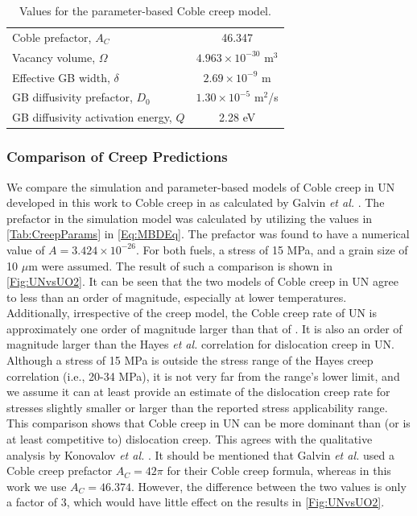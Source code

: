\documentclass[preprint, 12pt]{elsarticle}
\newcommand{\?}{\stackrel{?}{=}}
\begin{document}
\begin{table}[h!]
\centering
\caption{Values for the parameter-based Coble creep model.}
\footnotesize
\begin{tabular}{lc}
\hline
Coble prefactor, $A_C$ & 46.347 \\
Vacancy volume, $\Omega$ & $4.963 \times 10^{-30}$ m$^3$ \\
Effective GB width, $\delta$ & $2.69 \times 10^{-9}$ m \\
GB diffusivity prefactor, $D_0$ & $1.30 \times 10^{-5}$ m$^2$/s \\
GB diffusivity activation energy, $Q$ & 2.28 eV \\
\hline
\end{tabular}
\label{Tab:Params}
\end{table}


\subsubsection{Comparison of Creep Predictions}

We compare the simulation and parameter-based models of Coble creep in UN developed in this work to Coble creep in  as calculated by Galvin \textit{et al.} \cite{Galvin2024b}. The prefactor in the simulation model was calculated by utilizing the values in \cref{Tab:CreepParams} in \cref{Eq:MBDEq}. The prefactor was found to have a numerical value of $A = 3.424 \times 10^{-26}$. For both fuels, a stress of 15 MPa, and a grain size of 10 $\mu$m were assumed. The result of such a comparison is shown in \cref{Fig:UNvsUO2}. It can be seen that the two models of Coble creep in UN agree to less than an order of magnitude, especially at lower temperatures. Additionally, irrespective of the creep model, the Coble creep rate of UN is approximately one order of magnitude larger than that of . It is also an order of magnitude larger than the Hayes \textit{et al.} correlation for dislocation creep in UN. Although a stress of 15 MPa is outside the stress range of the Hayes creep correlation (i.e., 20-34 MPa), it is not very far from the range's lower limit, and we assume it can at least provide an estimate of the dislocation creep rate for stresses slightly smaller or larger than the reported stress applicability range. This comparison shows that Coble creep in UN can be more dominant than (or is at least competitive to) dislocation creep. This agrees with the qualitative analysis by Konovalov \textit{et al.} \cite{Konovalov2016}. It should be mentioned that Galvin \textit{et al.} \cite{Galvin2024b} used a Coble creep prefactor $A_C = 42 \pi$ for their  Coble creep formula, whereas in this work we use $A_C = 46.374$. However, the difference between the two values is only a factor of 3, which would have little effect on the results in \cref{Fig:UNvsUO2}.
\end{document}
